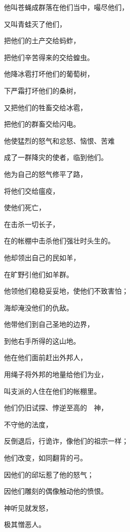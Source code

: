 {\par }{\Q {}他叫苍蝇成群落在他们当中，嘬尽他们，
\par }{\Q 又叫青蛙灭了他们，
\par }{\Q {}把他们的土产交给蚂蚱，
\par }{\Q 把他们辛苦得来的交给蝗虫。
\par }{\Q {}他降冰雹打坏他们的葡萄树，
\par }{\Q 下严霜打坏他们的桑树，
\par }{\Q {}又把他们的牲畜交给冰雹，
\par }{\Q 把他们的群畜交给闪电。
\par }{\Q {}他使猛烈的怒气和忿怒、恼恨、苦难
\par }{\Q 成了一群降灾的使者，临到他们。
\par }{\Q {}他为自己的怒气修平了路，
\par }{\Q 将他们交给瘟疫，
\par }{\Q 使他们死亡，
\par }{\Q {}在{}击杀一切长子，
\par }{\Q 在{}的帐棚中击杀他们强壮时头生的。
\par }{\Q {}他却领出自己的民如羊，
\par }{\Q 在旷野引他们如羊群。
\par }{\Q {}他领他们稳稳妥妥地，使他们不致害怕；
\par }{\Q 海却淹没他们的仇敌。
\par }{\Q {}他带他们到自己圣地的边界，
\par }{\Q 到他右手所得的这山地。
\par }{\Q {}他在他们面前赶出外邦人，
\par }{\Q 用绳子将外邦的地量给他们为业，
\par }{\Q 叫{}支派的人住在他们的帐棚里。
\par }{\BB \par }{\Q {}他们仍旧试探、悖逆至高的　神，
\par }{\Q 不守他的法度，
\par }{\Q {}反倒退后，行诡诈，像他们的祖宗一样；
\par }{\Q 他们改变，如同翻背的弓。
\par }{\Q {}因他们的邱坛惹了他的怒气；
\par }{\Q 因他们雕刻的偶像触动他的愤恨。
\par }{\Q {}神听见就发怒，
\par }{\Q 极其憎恶{}人。
}
